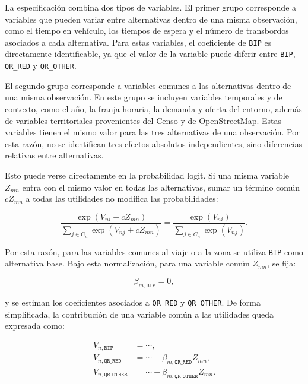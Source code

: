 La especificación combina dos tipos de variables. El primer grupo corresponde a variables que pueden variar entre alternativas dentro de una misma observación, como el tiempo en vehículo, los tiempos de espera y el número de transbordos asociados a cada alternativa. Para estas variables, el coeficiente de \texttt{BIP} es directamente identificable, ya que el valor de la variable puede diferir entre \texttt{BIP}, \texttt{QR\_RED} y \texttt{QR\_OTHER}.

El segundo grupo corresponde a variables comunes a las alternativas dentro de una misma observación. En este grupo se incluyen variables temporales y de contexto, como el año, la franja horaria, la demanda y oferta del entorno, además de variables territoriales provenientes del Censo y de OpenStreetMap. Estas variables tienen el mismo valor para las tres alternativas de una observación. Por esta razón, no se identifican tres efectos absolutos independientes, sino diferencias relativas entre alternativas.

Esto puede verse directamente en la probabilidad logit. Si una misma variable \(Z_{mn}\) entra con el mismo valor en todas las alternativas, sumar un término común \(c Z_{mn}\) a todas las utilidades no modifica las probabilidades:

\begin{equation}
    \frac{\exp(V_{ni} + c Z_{mn})}
    {\sum_{j \in C_n} \exp(V_{nj} + c Z_{mn})}
    =
    \frac{\exp(V_{ni})}
    {\sum_{j \in C_n} \exp(V_{nj})}.
\end{equation}

Por esta razón, para las variables comunes al viaje o a la zona se utiliza \texttt{BIP} como alternativa base. Bajo esta normalización, para una variable común \(Z_{mn}\), se fija:

\begin{equation}
    \beta_{m,\texttt{BIP}} = 0,
\end{equation}

y se estiman los coeficientes asociados a \texttt{QR\_RED} y \texttt{QR\_OTHER}. De forma simplificada, la contribución de una variable común a las utilidades queda expresada como:

\begin{align}
    V_{n,\texttt{BIP}}
    &=
    \cdots, \\
    V_{n,\texttt{QR\_RED}}
    &=
    \cdots
    +
    \beta_{m,\texttt{QR\_RED}} Z_{mn}, \\
    V_{n,\texttt{QR\_OTHER}}
    &=
    \cdots
    +
    \beta_{m,\texttt{QR\_OTHER}} Z_{mn}.
\end{align}

